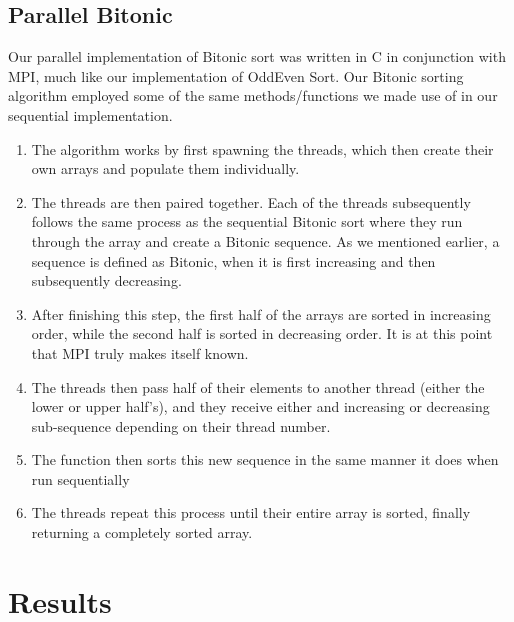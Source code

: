 \documentclass[11pt,twocolumn]{article}
\begin{document}
\subsection{ Parallel Bitonic}\label{soln}
Our parallel implementation of Bitonic sort was written in C in conjunction with MPI, much like our implementation of OddEven Sort. Our Bitonic sorting algorithm employed some of the same methods/functions we made use of in our sequential implementation. 
\begin{enumerate}
    \item The algorithm works by first spawning the threads, which then create their own arrays and populate them individually.
    \item  The threads are then paired together. Each of the threads subsequently follows the same process as the sequential Bitonic sort where they run through the array and create a Bitonic sequence. As we mentioned earlier, a sequence is defined as Bitonic, when it is first increasing and then subsequently decreasing.
    \item After finishing this step, the first half of the arrays are sorted in increasing order, while the second half is sorted in decreasing order. It is at this point that MPI truly makes itself known.
    \item The threads then pass half of their elements to another thread (either the lower or upper half's), and they receive either and increasing or decreasing sub-sequence depending on their thread number.
    \item The function then sorts this new sequence in the same manner it does when run sequentially
    \item The threads repeat this process until their entire array is sorted, finally returning a completely sorted array. 
\end{enumerate}  



\section {Results}\label{results}
\end{document}
